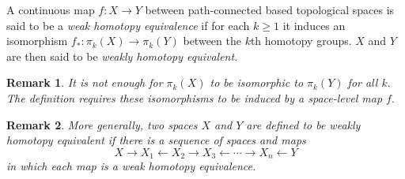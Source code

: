 \documentclass[12pt]{article}
\newcommand{\funcsig}[2]{#1\rightarrow #2}
\newcommand{\funcdef}[3]{#1:\funcsig{#2}{#3}}
\newtheorem{rmk}{Remark}
\newcommand{\from}{\leftarrow}
\begin{document}

A continuous map $\funcdef{f}{X}{Y}$ between path-connected based 
topological spaces is said to be a {\em weak homotopy equivalence\/} if for each $k\ge 1$ it induces an isomorphism $\funcdef{f_*}{\pi_k(X)}{\pi_k(Y)}$ between the
$k$th homotopy groups. $X$ and $Y$ are then said to be {\em weakly
homotopy equivalent.} 

\begin{rmk}
  It is {\em not\/} enough for $\pi_k(X)$ to be isomorphic to
  $\pi_k(Y)$ for all $k.$ The definition requires these isomorphisms
  to be induced by a space-level map $f.$
\end{rmk}

\begin{rmk}
  More generally, two spaces $X$ and $Y$ are defined to be weakly homotopy equivalent if there is a sequence of spaces and maps
  $$ X \to X_1 \from X_2 \to X_3 \from \cdots \to X_n \from Y$$ in which each map is a weak homotopy equivalence.
\end{rmk}


\end{document}
